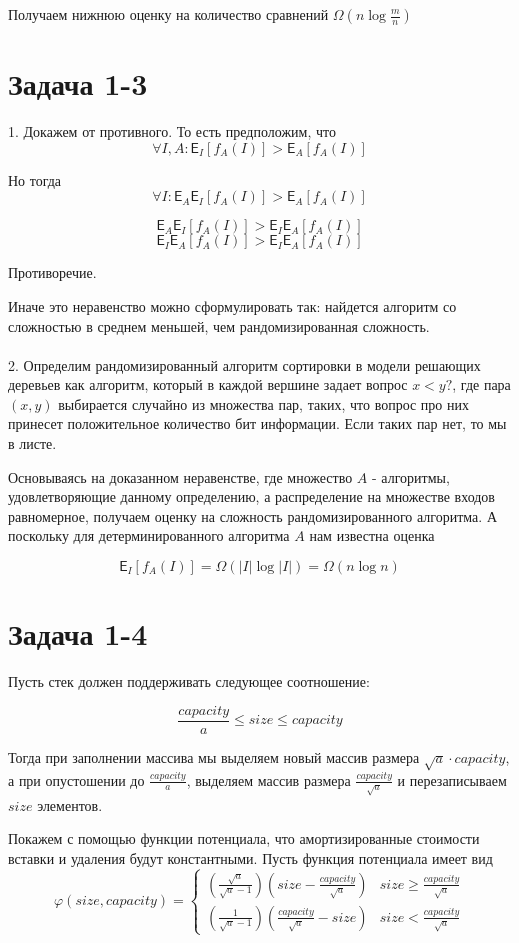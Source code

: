 \documentclass{article}
\newcommand{\E}{\ensuremath{\mathsf{E}}}  %
\renewcommand{\phi}{\varphi}  %
\renewcommand{\le}{\leqslant}  %
\renewcommand{\ge}{\geqslant}  %
\begin{document}
Получаем нижнюю оценку на количество сравнений $\Omega(n\log \frac{m}{n})$

\section{Задача 1-3}

1. Докажем от противного. То есть предположим, что $$
\forall I, A: \E_I[f_A(I)] > \E_A[f_A(I)]$$

Но тогда 
$$\forall I: \E_A\E_I[f_A(I)] > \E_A[f_A(I)]$$

$$\E_A\E_I[f_A(I)] > \E_I\E_A[f_A(I)]$$
$$\E_I\E_A[f_A(I)] > \E_I\E_A[f_A(I)]$$

Противоречие.

Иначе это неравенство можно сформулировать так: найдется алгоритм со сложностью в среднем меньшей, чем рандомизированная сложность.
\paragraph{}
2. Определим рандомизированный алгоритм сортировки в модели решающих деревьев как алгоритм, который в каждой вершине задает вопрос $x < y?$, где пара $(x,y)$ выбирается случайно из множества пар, таких, что вопрос про них принесет положительное количество бит информации. Если таких пар нет, то мы в листе.

Основываясь на доказанном неравенстве, где множество $A$ - алгоритмы, удовлетворяющие данному определению, а распределение на множестве входов равномерное, получаем оценку на сложность рандомизированного алгоритма. А поскольку для детерминированного алгоритма $A$ нам известна оценка 

$$\E_I[f_A(I)] = \Omega(|I| \log |I|) = \Omega(n\log n) $$

\section{Задача 1-4}

Пусть стек должен поддерживать следующее соотношение:

$$ \frac{capacity}{a} \le size \le capacity $$

Тогда при заполнении массива мы выделяем новый массив размера 
$\sqrt{a}\cdot capacity$, а при опустошении до $\frac{capacity}{a}$, выделяем массив размера $\frac{capacity}{\sqrt{a}}$ и перезаписываем $size$ элементов.

Покажем с помощью функции потенциала, что амортизированные стоимости вставки и удаления будут константными. Пусть функция потенциала имеет вид 
\begin{equation*}
\phi (size, capacity) = \begin{cases} 
      \left(\frac{\sqrt{a}}{\sqrt{a} - 1}\right)\left(size - \frac{capacity}{\sqrt{a}}\right) & size \ge \frac{capacity}{\sqrt{a}} \\
      \left(\frac{1}{\sqrt{a} - 1}\right)\left( \frac{capacity}{\sqrt{a}} - size\right) & size < \frac{capacity}{\sqrt{a}}
   \end{cases}
\end{equation*}
\end{document}
